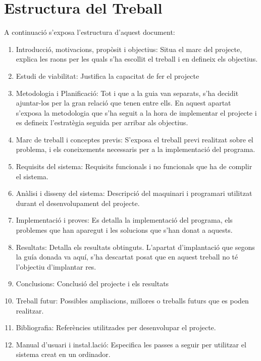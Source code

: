 \documentclass[11pt,a4paper,twoside]{report}
\begin{document}
  \section{Estructura del Treball}
  A continuació s'exposa l'estructura d'aquest document: 
  \begin{enumerate}
    \item Introducció, motivacions, propòsit i objectius: Situa el marc del projecte, explica les raons per les quals s'ha escollit el treball i en defineix els objectius.
    \item Estudi de viabilitat: Justifica la capacitat de fer el projecte
    \item Metodologia i Planificació: Tot i que a la guia van separats, s'ha decidit ajuntar-los per la gran relació que tenen entre ells. En aquest apartat s'exposa la metodologia que s'ha seguit a la hora de implementar el projecte i es defineix l'estratègia seguida per arribar als objectius.
    \item Marc de treball i conceptes previs: S'exposa el treball previ realitzat sobre el problema, i els coneixements necessaris per a la implementació del programa.
    \item Requisits del sistema: Requisits funcionals i no funcionals que ha de complir el sistema.
    \item Anàlisi i disseny del sistema: Descripció del maquinari i programari utilitzat durant el desenvolupament del projecte.
    \item Implementació i proves: Es detalla la implementació del programa, els problemes que han aparegut i les solucions que s'han donat a aquests.
    \item Resultats: Detalla els resultats obtinguts. L'apartat d'implantació que segons la guía donada va aquí, s'ha descartat posat que en aquest treball no té l'objectiu d'implantar res.
    \item Conclusions: Conclusió del projecte i els resultats
    \item Treball futur: Possibles ampliacions, millores o treballs futurs que es poden realitzar.
    \item Bibliografia: Referències utilitzades per desenvolupar el projecte.
    \item Manual d'usuari i insta\l.lació: Especifica les passes a seguir per utilitzar el sistema creat en un ordinador.

  \end{enumerate}
\end{document}
